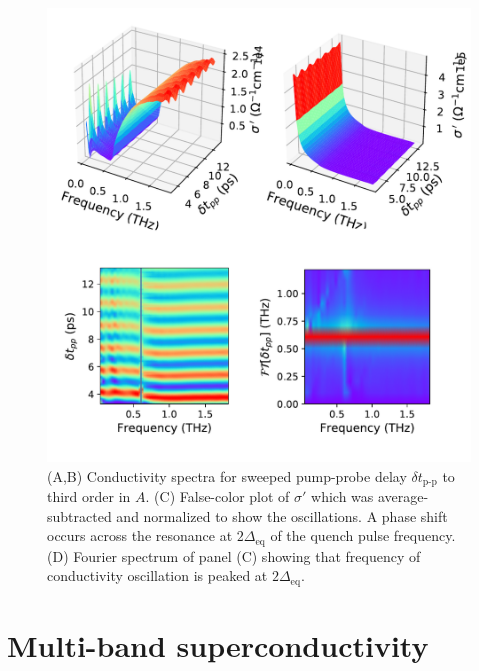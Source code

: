 \documentclass[aps,prb,reprint,noeprint,superscriptaddress]{revtex4-1}
\begin{document}
\begin{figure}[t]
	\centering
	\includegraphics[width=\columnwidth]{figures/fig3.pdf}
	\caption{(A,B) Conductivity spectra for sweeped pump-probe delay $\delta
	t_{\text{p-p}}$ to third order in $A$. (C) False-color plot of
$\sigma' $ which was average-subtracted and normalized to show the oscillations.
A phase shift occurs across the resonance at $2\Delta_{\text{eq}}$ of the quench pulse
frequency. (D) Fourier spectrum of panel (C) showing that frequency of
conductivity oscillation is peaked at $2\Delta_{\text{eq}}$.}
\end{figure}
\section{Multi-band superconductivity}
\label{sec:multiband}
\end{document}

